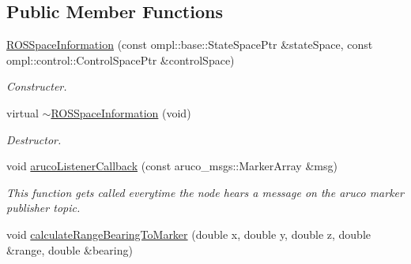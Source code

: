 \subsection*{Public Member Functions}
\begin{DoxyCompactItemize}
\item 
\hypertarget{classfirm_1_1_r_o_s_space_information_a29715a6c39ff998144005c42d0b025a2}{\hyperlink{classfirm_1_1_r_o_s_space_information_a29715a6c39ff998144005c42d0b025a2}{R\-O\-S\-Space\-Information} (const ompl\-::base\-::\-State\-Space\-Ptr \&state\-Space, const ompl\-::control\-::\-Control\-Space\-Ptr \&control\-Space)}\label{classfirm_1_1_r_o_s_space_information_a29715a6c39ff998144005c42d0b025a2}

\begin{DoxyCompactList}\small\item\em Constructer. \end{DoxyCompactList}\item 
\hypertarget{classfirm_1_1_r_o_s_space_information_ad1cf7a840ad6491192ba96577ffdcf91}{virtual \hyperlink{classfirm_1_1_r_o_s_space_information_ad1cf7a840ad6491192ba96577ffdcf91}{$\sim$\-R\-O\-S\-Space\-Information} (void)}\label{classfirm_1_1_r_o_s_space_information_ad1cf7a840ad6491192ba96577ffdcf91}

\begin{DoxyCompactList}\small\item\em Destructor. \end{DoxyCompactList}\item 
\hypertarget{classfirm_1_1_r_o_s_space_information_a56059a1b95d7b35ef2a5dd1a4ddedd86}{void \hyperlink{classfirm_1_1_r_o_s_space_information_a56059a1b95d7b35ef2a5dd1a4ddedd86}{aruco\-Listener\-Callback} (const aruco\-\_\-msgs\-::\-Marker\-Array \&msg)}\label{classfirm_1_1_r_o_s_space_information_a56059a1b95d7b35ef2a5dd1a4ddedd86}

\begin{DoxyCompactList}\small\item\em This function gets called everytime the node hears a message on the aruco marker publisher topic. \end{DoxyCompactList}\item 
\hypertarget{classfirm_1_1_r_o_s_space_information_a4de87b31909417c88d71cbbfdfddeb65}{void \hyperlink{classfirm_1_1_r_o_s_space_information_a4de87b31909417c88d71cbbfdfddeb65}{calculate\-Range\-Bearing\-To\-Marker} (double x, double y, double z, double \&range, double \&bearing)}\label{classfirm_1_1_r_o_s_space_information_a4de87b31909417c88d71cbbfdfddeb65}


\end{DoxyCompactItemize}

